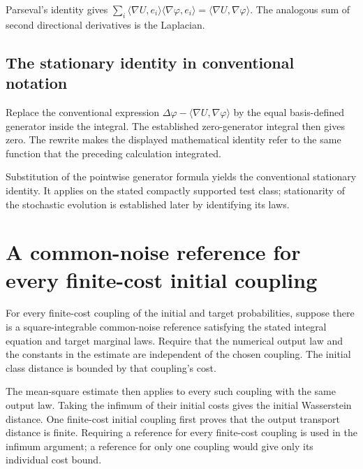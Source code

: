 \documentclass[11pt,a4paper]{report}
\begin{document}
Parseval's identity gives \(\sum_i\langle\nabla U,e_i\rangle\langle\nabla\varphi,e_i\rangle=\langle\nabla U,\nabla\varphi\rangle\). The analogous sum of second directional derivatives is the Laplacian.

\subsection{\texorpdfstring{The stationary identity in conventional notation}{The stationary identity in conventional notation}}
\label{report-step-UnadjustedLangevin-Generator-lean-15}


Replace the conventional expression \(\Delta\varphi-\langle\nabla U,\nabla\varphi\rangle\) by the equal basis-defined generator inside the integral. The established zero-generator integral then gives zero. The rewrite makes the displayed mathematical identity refer to the same function that the preceding calculation integrated.



Substitution of the pointwise generator formula yields the conventional stationary identity. It applies on the stated compactly supported test class; stationarity of the stochastic evolution is established later by identifying its laws.

\section{\texorpdfstring{A common-noise reference for every finite-cost initial coupling}{A common-noise reference for every finite-cost initial coupling}}
\label{proof-module-UnadjustedLangevin-ReferenceFamily-lean}


For every finite-cost coupling of the initial and target probabilities, suppose there is a square-integrable common-noise reference satisfying the stated integral equation and target marginal laws. Require that the numerical output law and the constants in the estimate are independent of the chosen coupling. The initial class distance is bounded by that coupling's cost.



The mean-square estimate then applies to every such coupling with the same output law. Taking the infimum of their initial costs gives the initial Wasserstein distance. One finite-cost initial coupling first proves that the output transport distance is finite. Requiring a reference for every finite-cost coupling is used in the infimum argument; a reference for only one coupling would give only its individual cost bound.
\end{document}
